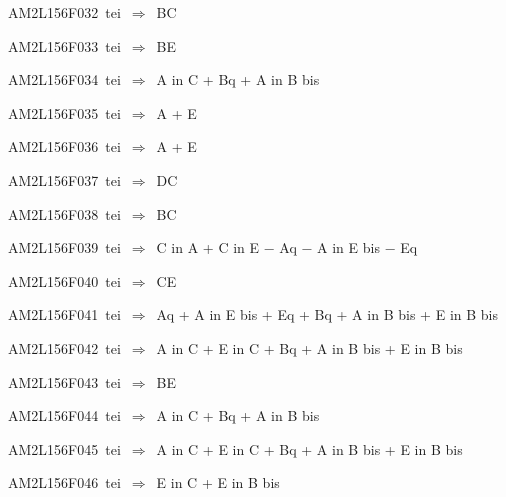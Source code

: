 {\sixrm AM2L156F032\ {\sixit tei}\ }$\Rightarrow$\ BC\par\smallskip
{\sixrm AM2L156F033\ {\sixit tei}\ }$\Rightarrow$\ BE\par\smallskip
{\sixrm AM2L156F034\ {\sixit tei}\ }$\Rightarrow$\ {\tenit A} {\tenit in} {\tenit C} + {\tenit Bq} + {\tenit A} {\tenit in} {\tenit B} {\tenit bis}\par\smallskip
{\sixrm AM2L156F035\ {\sixit tei}\ }$\Rightarrow$\ {\tenit A} + {\tenit E}\par\smallskip
{\sixrm AM2L156F036\ {\sixit tei}\ }$\Rightarrow$\ {\tenit A} + {\tenit E}\par\smallskip
{\sixrm AM2L156F037\ {\sixit tei}\ }$\Rightarrow$\ DC\par\smallskip
{\sixrm AM2L156F038\ {\sixit tei}\ }$\Rightarrow$\ BC\par\smallskip
{\sixrm AM2L156F039\ {\sixit tei}\ }$\Rightarrow$\ {\tenit C} {\tenit in} {\tenit A} + {\tenit C} {\tenit in} {\tenit E} − {\tenit Aq} − {\tenit A} {\tenit in} {\tenit E} {\tenit bis} − {\tenit Eq}\par\smallskip
{\sixrm AM2L156F040\ {\sixit tei}\ }$\Rightarrow$\ CE\par\smallskip
{\sixrm AM2L156F041\ {\sixit tei}\ }$\Rightarrow$\ {\tenit Aq} + {\tenit A} {\tenit in} {\tenit E} {\tenit bis} + {\tenit Eq} + {\tenit Bq} + {\tenit A} {\tenit in} {\tenit B} {\tenit bis} + {\tenit E} {\tenit in} {\tenit B} {\tenit bis}\par\smallskip
{\sixrm AM2L156F042\ {\sixit tei}\ }$\Rightarrow$\ {\tenit A} {\tenit in} {\tenit C} + {\tenit E} {\tenit in} {\tenit C} + {\tenit Bq} + {\tenit A} {\tenit in} {\tenit B} {\tenit bis} + {\tenit E} {\tenit in} {\tenit B} {\tenit bis}\par\smallskip
{\sixrm AM2L156F043\ {\sixit tei}\ }$\Rightarrow$\ BE\par\smallskip
{\sixrm AM2L156F044\ {\sixit tei}\ }$\Rightarrow$\ {\tenit A} {\tenit in} {\tenit C} + {\tenit Bq} + {\tenit A} {\tenit in} {\tenit B} {\tenit bis}\par\smallskip
{\sixrm AM2L156F045\ {\sixit tei}\ }$\Rightarrow$\ {\tenit A} {\tenit in} {\tenit C} + {\tenit E} {\tenit in} {\tenit C} + {\tenit Bq} + {\tenit A} {\tenit in} {\tenit B} {\tenit bis} + {\tenit E} {\tenit in} {\tenit B} {\tenit bis}\par\smallskip
{\sixrm AM2L156F046\ {\sixit tei}\ }$\Rightarrow$\ {\tenit E} {\tenit in} {\tenit C} + {\tenit E} {\tenit in} {\tenit B} {\tenit bis}\par\smallskip

